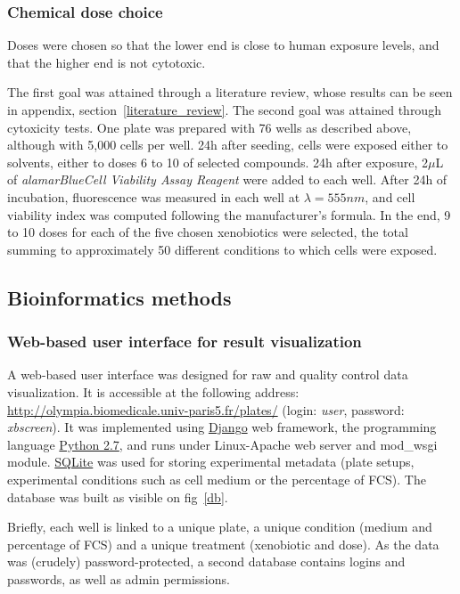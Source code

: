 \subsubsection{Chemical dose choice}
Doses were chosen so that the lower end is close to human exposure levels, and that the higher end is not cytotoxic.

The first goal was attained through a literature review, whose results can be seen in appendix, section~\ref{literature_review}. The second goal was attained through cytoxicity tests. One plate was prepared with 76 wells as described above, although with 5,000 cells per well. 24h after seeding, cells were exposed either to solvents, either to doses 6 to 10 of selected compounds. 24h after exposure, 2$\mu$L of \textit{alamarBlue\texttrademark Cell Viability Assay Reagent} were added to each well. After 24h of incubation, fluorescence was measured in each well at $\lambda = 555nm$, and cell viability index was computed following the manufacturer's formula. In the end, 9 to 10 doses for each of the five chosen xenobiotics were selected, the total summing to approximately 50 different conditions to which cells were exposed.

\subsection{Bioinformatics methods}
\label{interface}
\subsubsection{Web-based user interface for result visualization}  A web-based user interface was designed for raw  and quality control data visualization. It is accessible at the following address: \href{http://olympia.biomedicale.univ-paris5.fr/plates/}{http://olympia.biomedicale.univ-paris5.fr/plates/} (login: \textit{user}, password: \textit{xbscreen}). It was implemented using \href{https://www.djangoproject.com/}{Django} web framework, the programming language \href{http://www.python.org}{Python 2.7}, and runs under Linux-Apache web server and mod\_wsgi module. \href{https://sqlite.org/}{SQLite} was used for storing experimental metadata (plate setups, experimental conditions such as cell medium or the percentage of FCS). The database was built as visible on fig~\ref{db}.

Briefly, each well is linked to a unique plate, a unique condition (medium and percentage of FCS) and a unique treatment (xenobiotic and dose). As the data was (crudely) password-protected, a second database contains logins and passwords, as well as admin permissions.

